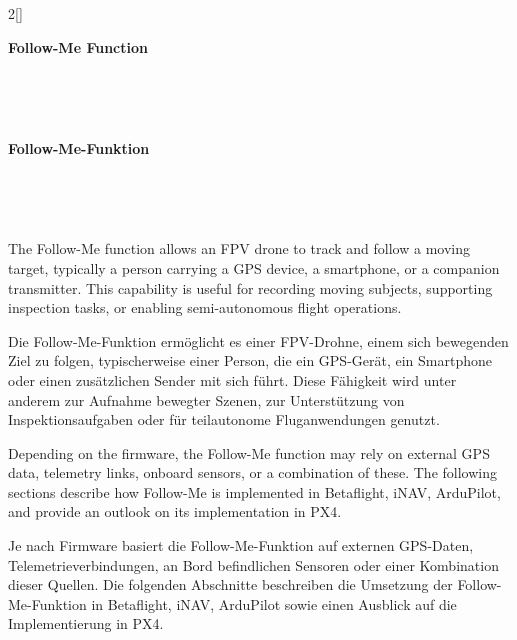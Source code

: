 \renewcommand{\deutschertitel}{Follow-Me-Funktion}
\renewcommand{\englischertitel}{Follow-Me Function}
\chapter[\texorpdfstring{\protect{\vspace{2pt}\englischertitel}}{\englischertitel}]{}
\kapitel{\deutschertitel}
\thispagestyle{empty}

\label{KapitelFollowme}

\begin{paracol}{2}[]

{\raggedright\huge\bfseries\sffamily \englischertitel \par\ } \\[1.8ex]

\switchcolumn

{\raggedright\huge\bfseries\sffamily \deutschertitel \par\ } \\[1.8ex]

\coleng

The Follow-Me function allows an FPV drone to track and follow a moving target, typically a person carrying a GPS device, a smartphone, or a companion transmitter. This capability is useful for recording moving subjects, supporting inspection tasks, or enabling semi-autonomous flight operations. 

\colger

Die Follow-Me-Funktion ermöglicht es einer FPV-Drohne, einem sich bewegenden Ziel zu folgen, typischerweise einer Person, die ein GPS-Gerät, ein Smartphone oder einen zusätzlichen Sender mit sich führt. Diese Fähigkeit wird unter anderem zur Aufnahme bewegter Szenen, zur Unterstützung von Inspektionsaufgaben oder für teilautonome Fluganwendungen genutzt. 

\coleng

Depending on the firmware, the Follow-Me function may rely on external GPS data, telemetry links, onboard sensors, or a combination of these. The following sections describe how Follow-Me is implemented in Betaflight, iNAV, ArduPilot, and provide an outlook on its implementation in PX4. 

\colger

Je nach Firmware basiert die Follow-Me-Funktion auf externen GPS-Daten, Telemetrieverbindungen, an Bord befindlichen Sensoren oder einer Kombination dieser Quellen. Die folgenden Abschnitte beschreiben die Umsetzung der Follow-Me-Funktion in Betaflight, iNAV, ArduPilot sowie einen Ausblick auf die Implementierung in PX4. 


\end{paracol}

